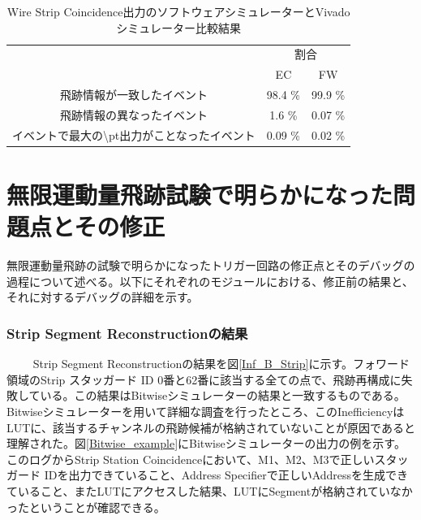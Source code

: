 \begin{table}[]
    \centering
    \caption{Wire Strip Coincidence出力のソフトウェアシミュレーターとVivadoシミュレーター比較結果}
    \label{tab:Vivado_WS}
    \begin{tabular}{|c|cc|}
    \hline
    \multirow{2}{*}{}                      & \multicolumn{2}{c|}{割合}                \\ \cline{2-3} 
                                           & \multicolumn{1}{c|}{EC}      & FW      \\ \hline\hline
    飛跡情報が一致したイベント                          & \multicolumn{1}{c|}{98.4 \%} & 99.9 \% \\ \hline
    飛跡情報の異なったイベント                          & \multicolumn{1}{c|}{1.6 \%}  & 0.07 \% \\ \hline
    イベントで最大の\textbackslash{}pt出力がことなったイベント & \multicolumn{1}{c|}{0.09 \%} & 0.02 \% \\ \hline
    \end{tabular}
\end{table}



\clearpage


\section{無限運動量飛跡試験で明らかになった問題点とその修正}
\label{sec:appendix:infinite-momentum-tracks}
無限運動量飛跡の試験で明らかになったトリガー回路の修正点とそのデバッグの過程について述べる。以下にそれぞれのモジュールにおける、修正前の結果と、それに対するデバッグの詳細を示す。


\subsubsection{Strip Segment Reconstructionの結果}　　
Strip Segment Reconstructionの結果を図\ref{Inf_B_Strip}に示す。フォワード領域のStrip スタッガード ID 0番と62番に該当する全ての点で、飛跡再構成に失敗している。この結果はBitwiseシミュレーターの結果と一致するものである。Bitwiseシミュレーターを用いて詳細な調査を行ったところ、このInefficiencyはLUTに、該当するチャンネルの飛跡候補が格納されていないことが原因であると理解された。図\ref{Bitwise_example}にBitwiseシミュレーターの出力の例を示す。このログからStrip Station Coincidenceにおいて、M1、M2、M3で正しいスタッガード IDを出力できていること、Address Specifierで正しいAddressを生成できていること、またLUTにアクセスした結果、LUTにSegmentが格納されていなかったということが確認できる。

